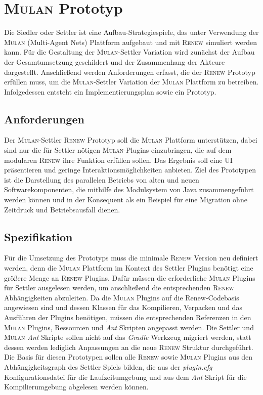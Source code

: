 \chapter{\textsc{Mulan} Prototyp} \label{cha:mulan_settler}
	Die Siedler oder Settler ist eine Aufbau-Strategiespiele, das unter Verwendung der \textsc{Mulan} (Multi-Agent Nets) Plattform aufgebaut und mit \textsc{Renew} simuliert werden kann. \bigbreak
	Für die Gestaltung der \textsc{Mulan}-Settler Variation wird zunächst der Aufbau der Gesamtumsetzung geschildert und der Zusammenhang der Akteure dargestellt. Anschließend werden Anforderungen erfasst, die der \textsc{Renew} Prototyp erfüllen muss, um die \textsc{Mulan}-Settler Variation der \textsc{Mulan} Plattform zu betreiben. Infolgedessen entsteht ein Implementierungsplan sowie ein Prototyp.

\section{Anforderungen} \label{sec:anforderungen2}
	Der \textsc{Mulan}-Settler \textsc{Renew} Prototyp soll die \textsc{Mulan} Plattform unterstützen, dabei sind nur die für Settler nötigen \textsc{Mulan}-Plugins einzubringen, die auf dem modularen \textsc{Renew} ihre Funktion erfüllen sollen. Das Ergebnis soll eine UI präsentieren und geringe Interaktionsmöglichkeiten anbieten. \newline 
	Ziel des Prototypen ist die Darstellung des parallelen Betriebs von alten und neuen Softwarekomponenten, die mithilfe des Modulsystem von Java zusammengeführt werden können und in der Konsequent als ein Beispiel für eine Migration ohne  Zeitdruck und Betriebsausfall dienen.

\section{Spezifikation}
	Für die Umsetzung des Prototyps muss die minimale \textsc{Renew} Version neu definiert werden, denn die \textsc{Mulan} Plattform im Kontext des Settler Plugins benötigt eine größere Menge an \textsc{Renew} Plugins. Dafür müssen die erforderliche \textsc{Mulan} Plugins für Settler ausgelesen werden, um anschließend die entsprechenden \textsc{Renew} Abhängigkeiten abzuleiten. \newline
	Da die \textsc{Mulan} Plugins auf die Renew-Codebasis angewiesen sind und dessen Klassen für das Kompilieren, Verpacken und das Ausführen der Plugins benötigen, müssen die entsprechenden Referenzen in den \textsc{Mulan} Plugins, Ressourcen und \textit{Ant} Skripten angepasst werden. \newline
	Die Settler und \textsc{Mulan} \textit{Ant} Skripte sollen nicht auf das \textit{Gradle} Werkzeug migriert werden, statt dessen werden lediglich Anpassungen an die neue \textsc{Renew} Struktur durchgeführt. \bigbreak
	Die Basis für diesen Prototypen sollen alle \textsc{Renew} sowie \textsc{Mulan} Plugins aus den Abhängigkeitsgraph des Settler Spiels bilden, die aus der \textit{plugin.cfg} Konfigurationsdatei für die Laufzeitumgebung und aus dem \textit{Ant} Skript für die Kompilierumgebung abgelesen werden können. 


